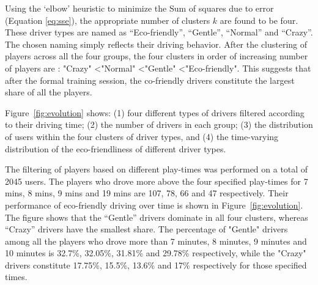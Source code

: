\documentclass[preprint,authoryear,12pt]{elsarticle}
\begin{document}

Using the `elbow' heuristic to minimize the Sum of squares due to error (Equation \ref{eq:sse}), the appropriate number of clusters $k$ are found to be four.
These driver types are named as ``Eco-friendly'', ``Gentle'', ``Normal'' and ``Crazy''. The chosen naming simply reflects their driving behavior. After the clustering of players across all the four groups, the four clusters in order of increasing number of players are :  "Crazy" \textless "Normal" \textless "Gentle" \textless "Eco-friendly".  This suggests that after the formal training session, the co-friendly drivers constitute the largest share of all the players. 


Figure~\ref{fig:evolution} shows: (1) four different types of drivers filtered according to their driving time; (2) the number of drivers in each group; (3) the distribution of users within the four clusters of driver types, and (4) the time-varying distribution of the eco-friendliness of different driver types.

The filtering of players based on different play-times was performed on a total of 2045 users. The players who drove more above the four specified play-times for 7 mins, 8 mins, 9 mins and 19 mins are 107, 78, 66 and 47 respectively. Their performance of eco-friendly driving over time is shown in Figure~\ref{fig:evolution}. The figure shows that the ``Gentle'' drivers dominate in all four clusters, whereas ``Crazy'' drivers have the smallest share. The percentage of "Gentle" drivers among all the players who drove more than 7 minutes, 8 minutes, 9 minutes and 10 minutes is 32.7\%, 32.05\%, 31.81\% and 29.78\%  respectively, while the "Crazy" drivers constitute 17.75\%, 15.5\%, 13.6\% and 17\% respectively for those specified times.








 
\end{document}
